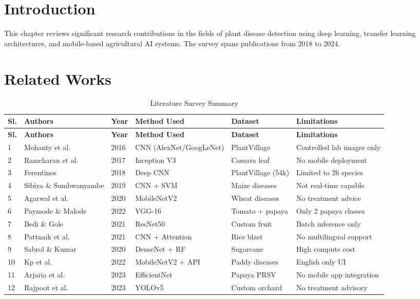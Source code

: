 \documentclass[12pt,a4paper]{report}
\begin{document}
\section{Introduction}
This chapter reviews significant research contributions in the fields of plant disease detection using deep learning, transfer learning architectures, and mobile-based agricultural AI systems. The survey spans publications from 2018 to 2024.

\section{Related Works}

\vspace{0.3cm}
\begin{center}
{\small
\begin{longtable}{|p{0.5cm}|p{2.5cm}|p{1.5cm}|p{3cm}|p{2cm}|p{2.5cm}|}
\caption{Literature Survey Summary}\label{tab:lit_survey}\\
\hline
\textbf{Sl.} & \textbf{Authors} & \textbf{Year} & \textbf{Method Used} & \textbf{Dataset} & \textbf{Limitations} \\
\hline
\endfirsthead
\hline
\textbf{Sl.} & \textbf{Authors} & \textbf{Year} & \textbf{Method Used} & \textbf{Dataset} & \textbf{Limitations} \\
\hline
\endhead
1 & Mohanty et al. & 2016 & CNN (AlexNet/GoogLeNet) & PlantVillage & Controlled lab images only \\
\hline
2 & Ramcharan et al. & 2017 & Inception V3 & Cassava leaf & No mobile deployment \\
\hline
3 & Ferentinos & 2018 & Deep CNN & PlantVillage (54k) & Limited to 26 species \\
\hline
4 & Sibiya \& Sumbwanyambe & 2019 & CNN + SVM & Maize diseases & Not real-time capable \\
\hline
5 & Agarwal et al. & 2020 & MobileNetV2 & Wheat diseases & No treatment advice \\
\hline
6 & Paymode \& Malode & 2022 & VGG-16 & Tomato + papaya & Only 2 papaya classes \\
\hline
7 & Bedi \& Gole & 2021 & ResNet50 & Custom fruit & Batch inference only \\
\hline
8 & Pattnaik et al. & 2021 & CNN + Attention & Rice blast & No multilingual support \\
\hline
9 & Sabrol \& Kumar & 2020 & DenseNet + RF & Sugarcane & High compute cost \\
\hline
10 & Kp et al. & 2022 & MobileNetV2 + API & Paddy diseases & English only UI \\
\hline
11 & Arjaria et al. & 2023 & EfficientNet & Papaya PRSV & No mobile app integration \\
\hline
12 & Rajpoot et al. & 2023 & YOLOv5 & Custom orchard & No treatment advisory \\
\hline
\end{longtable}
}
\end{center}
\end{document}
